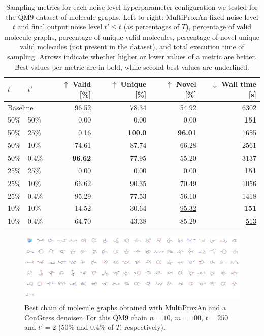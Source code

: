 \begin{table}[H]
    \centering
    \caption[MultiProxAn sampling metrics for the QM9 dataset of molecule graphs.]{Sampling metrics for each noise level hyperparameter configuration we tested for the QM9 dataset of molecule graphs. Left to right: MultiProxAn fixed noise level $t$ and final output noise level $t' \leq t$ (as percentages of $T$), percentage of valid molecule graphs, percentage of unique valid molecules, percentage of novel unique valid molecules (not present in the dataset), and total execution time of sampling. Arrows indicate whether higher or lower values of a metric are better. Best values per metric are in bold, while second-best values are underlined.}
    \begin{tabular}{llrrrr}
        \toprule
         $t$ & $t'$ & $\uparrow$ Valid [\%] & $\uparrow$ Unique [\%] & $\uparrow$ Novel [\%] & $\downarrow$ Wall time [s]  \\
         \midrule
         \multicolumn{2}{l}{Baseline} & \underline{96.52} & 78.34 & 54.92 & 6302 \\
         50\% & 50\% & 0.00 & 0.00 & 0.00 & \textbf{151} \\
         50\% & 25\% & 0.16 & \textbf{100.0} & \textbf{96.01} & 1655 \\
         50\% & 10\% & 74.61 & 87.74 & 66.28 & 2561 \\
         50\% & 0.4\% & \textbf{96.62} & 77.95 & 55.20 & 3137 \\
         25\% & 25\% & 0.00 & 0.00 & 0.00 & \textbf{151} \\
         25\% & 10\% & 66.62 & \underline{90.35} & 70.49 & 1056 \\
         25\% & 0.4\% & 95.29 & 77.53 & 56.10 & 1418 \\
         10\% & 10\% & 14.52 & 30.64 & \underline{95.32} & \textbf{151} \\
         10\% & 0.4\% & 64.70 & 43.38 & 85.29 & \underline{513} \\
         \bottomrule
    \end{tabular}
    \label{tab:qm9_stats}
\end{table}

\begin{figure}[H]
    \centering
    \includegraphics[width=\linewidth]{figures/multiprox/qm9_grid_image.png}
    \caption[Best chain of molecule graphs obtained with MultiProxAn.]{Best chain of molecule graphs obtained with MultiProxAn and a ConGress denoiser. For this QM9 chain $n=10$, $m=100$, $t=250$ and $t'=2$ (50\% and 0.4\% of $T$, respectively).
    }
    \label{fig:qm9_better}
\end{figure}


